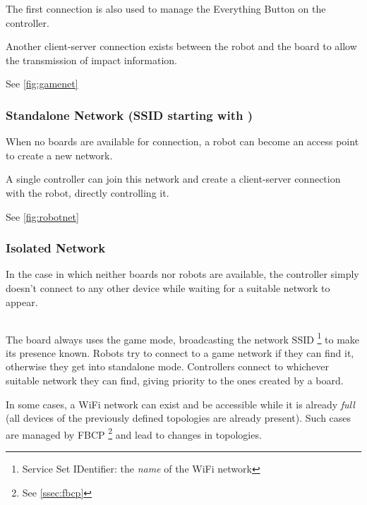   The first connection is also used to manage the Everything Button
  on the controller.

  Another client-server connection exists between the robot and the
  board to allow the transmission of impact information.

  See \autoref{fig:gamenet}

\subsubsection{Standalone Network (SSID starting with
  )}
  When no boards are available for connection, a robot can become an
  access point to create a new network.

  A single controller can join this network and create a
  client-server connection with the robot, directly controlling it.
  
  See \autoref{fig:robotnet}

\subsubsection{Isolated Network}
  In the case in which neither boards nor robots are available, the
  controller simply doesn't connect to any other device while
  waiting for a suitable network to appear.

\subsection*{}
The board always uses the game mode, broadcasting the network SSID%
\footnote{Service Set IDentifier: the \textit{name} of the WiFi
network} to make its presence known. Robots try to connect to a game
network if they can find it, otherwise they get into standalone
mode. Controllers connect to whichever suitable network they can
find, giving priority to the ones created by a board.

In some cases, a WiFi network can exist and be accessible while it
is already \textit{full} (all devices of the previously defined
topologies are already present). Such cases are managed by FBCP%
\footnote{See \autoref{ssec:fbcp}} and lead to changes in topologies.

